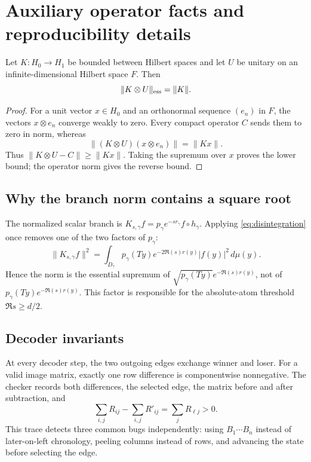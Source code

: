 \section{Auxiliary operator facts and reproducibility details}
\label{app:details}

\begin{lemma}
\label{lem:tensor-essential}
Let \(K:H_0\to H_1\) be bounded between Hilbert spaces and let \(U\) be
unitary on an infinite-dimensional Hilbert space \(F\).  Then
\[
 \|K\otimes U\|_{\mathrm{ess}}=\|K\|.
\]
\end{lemma}

\begin{proof}
For a unit vector \(x\in H_0\) and an orthonormal sequence \((e_n)\) in
\(F\), the vectors \(x\otimes e_n\) converge weakly to zero.  Every compact
operator \(C\) sends them to zero in norm, whereas
\[
 \|(K\otimes U)(x\otimes e_n)\|=\|Kx\|.
\]
Thus \(\|K\otimes U-C\|\ge\|Kx\|\).  Taking the supremum over \(x\) proves
the lower bound; the operator norm gives the reverse bound.
\end{proof}

\subsection{Why the branch norm contains a square root}

The normalized scalar branch is
\(K_{s,\gamma}f=p_\gamma e^{-sr_\gamma}f\circ h_\gamma\).  Applying
\eqref{eq:disintegration} once removes one of the two factors of
\(p_\gamma\):
\[
 \|K_{s,\gamma}f\|^2
 =\int_{D_\gamma}p_\gamma(Ty)e^{-2\Re(s)r(y)}|f(y)|^2\,d\mu(y).
\]
Hence the norm is the essential supremum of
\(\sqrt{p_\gamma(Ty)}e^{-\Re(s)r(y)}\), not of
\(p_\gamma(Ty)e^{-\Re(s)r(y)}\).  This factor is responsible for the
absolute-atom threshold \(\Re s\ge d/2\).

\subsection{Decoder invariants}

At every decoder step, the two outgoing edges exchange winner and loser.
For a valid image matrix, exactly one row difference is componentwise
nonnegative.  The checker records both differences, the selected edge, the
matrix before and after subtraction, and
\[
 \sum_{i,j}R_{ij}-\sum_{i,j}R'_{ij}
 =\sum_jR_{\ell j}>0.
\]
This trace detects three common bugs independently: using
\(B_1\cdots B_n\) instead of later-on-left chronology, peeling columns
instead of rows, and advancing the state before selecting the edge.

